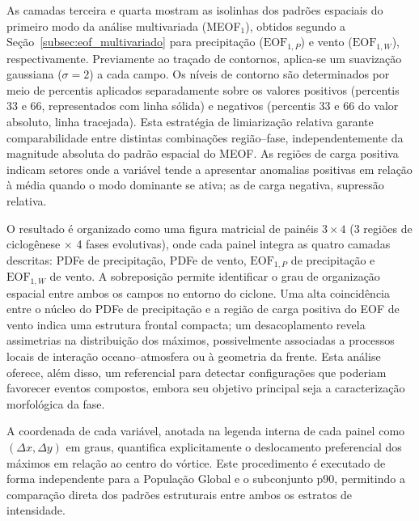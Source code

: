 As camadas terceira e quarta mostram as isolinhas dos padrões espaciais do primeiro modo da análise multivariada (MEOF$_1$), obtidos segundo a Seção~\ref{subsec:eof_multivariado} para precipitação ($\text{EOF}_{1,P}$) e vento ($\text{EOF}_{1,W}$), respectivamente.
Previamente ao traçado de contornos, aplica-se um suavização gaussiana ($\sigma = 2$) a cada campo. Os níveis de contorno são determinados por meio de percentis aplicados separadamente sobre os valores positivos (percentis 33 e 66, representados com linha sólida) e negativos (percentis 33 e 66 do valor absoluto, linha tracejada).
Esta estratégia de limiarização relativa garante comparabilidade entre distintas combinações região--fase, independentemente da magnitude absoluta do padrão espacial do MEOF.
As regiões de carga positiva indicam setores onde a variável tende a apresentar anomalias positivas em relação à média quando o modo dominante se ativa; as de carga negativa, supressão relativa.

O resultado é organizado como uma figura matricial de painéis $3 \times 4$ (3 regiões de ciclogênese $\times$ 4 fases evolutivas), onde cada painel integra as quatro camadas descritas: PDFe de precipitação, PDFe de vento, $\text{EOF}_{1,P}$ de precipitação e $\text{EOF}_{1,W}$ de vento.
A sobreposição permite identificar o grau de organização espacial entre ambos os campos no entorno do ciclone.
Uma alta coincidência entre o núcleo do PDFe de precipitação e a região de carga positiva do EOF de vento indica uma estrutura frontal compacta; um desacoplamento revela assimetrias na distribuição dos máximos, possivelmente associadas a processos locais de interação oceano--atmosfera ou à geometria da frente.
Esta análise oferece, além disso, um referencial para detectar configurações que poderiam favorecer eventos compostos, embora seu objetivo principal seja a caracterização morfológica da fase.

A coordenada de cada variável, anotada na legenda interna de cada painel como $(\Delta x, \Delta y)$ em graus, quantifica explicitamente o deslocamento preferencial dos máximos em relação ao centro do vórtice. Este procedimento é executado de forma independente para a População Global e o subconjunto p90, permitindo a comparação direta dos padrões estruturais entre ambos os estratos de intensidade.
